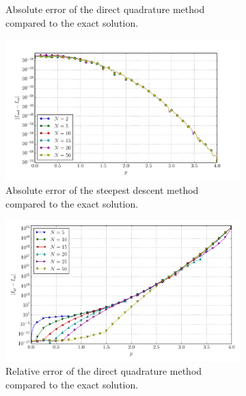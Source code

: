 \documentclass[a4paper,10pt]{article}
\begin{document}
\begin{figure}[ht!]
\begin{subfigure}[t]{0.5\linewidth}
    \caption{Absolute error of the direct quadrature method compared to the exact solution.}
    \label{fig:tp_1d_conv_p_2_1_err_qr}
  \end{subfigure}
  \begin{subfigure}[t]{0.5\linewidth}
    \includegraphics[width=\linewidth]{./plots/tp_1d_conv_p_2_1_err_nsd.pdf}
    \caption{Absolute error of the steepest descent method compared to the exact solution.}
    \label{fig:tp_1d_conv_p_2_1_err_nsd}
  \end{subfigure}
  \begin{subfigure}[t]{0.5\linewidth}
    \includegraphics[width=\linewidth]{./plots/tp_1d_conv_p_2_1_err_rel_qr.pdf}
    \caption{Relative error of the direct quadrature method compared to the exact solution.}
    \label{fig:tp_1d_conv_p_2_1_err_qr}
  \end{subfigure}
  \begin{subfigure}[t]{0.5\linewidth}

\end{subfigure}
\end{figure}
\end{document}
